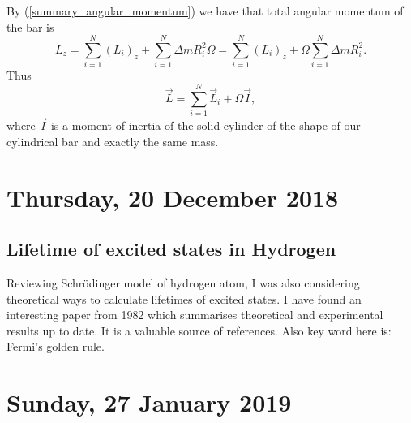 \documentclass[main.tex]{subfiles}
\begin{document}
By (\ref{summary_angular_momentum}) we have that total angular momentum of the bar is
\begin{equation}
L_z = \sum_{i=1}^N (L_i)_z + \sum_{i=1}^N \Delta mR_i^2\Omega = \sum_{i=1}^N (L_i)_z + \Omega \sum_{i=1}^N \Delta mR_i^2.
\end{equation}
Thus
\begin{equation}
\vec{L} = \sum_{i=1}^N \vec{L}_i + \Omega \vec{I},
\end{equation}
where $\vec{I}$ is a moment of inertia of the solid cylinder of the shape of our cylindrical bar and exactly the same mass.
\section{Thursday, 20 December 2018}
\subsection{Lifetime of excited states in Hydrogen}
Reviewing Schrödinger model of hydrogen atom, I was also considering theoretical ways to calculate lifetimes of excited states. I have found an interesting paper \cite{verolainen_nikolaich1982} from 1982 which summarises theoretical and experimental results up to date. It is a valuable source of references.
Also key word here is: Fermi's golden rule.
\section{Sunday, 27 January 2019}
\end{document}

